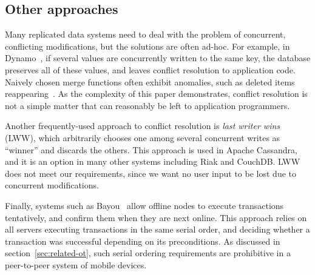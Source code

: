 \documentclass[10pt,journal,compsoc]{IEEEtran}
\begin{document}
\subsection{Other approaches}\label{sec:related-other}

Many replicated data systems need to deal with the problem of concurrent, conflicting modifications, but the solutions are often ad-hoc. For example, in Dynamo~\cite{DeCandia:2007ui}, if several values are concurrently written to the same key, the database preserves all of these values, and leaves conflict resolution to application code. Naively chosen merge functions often exhibit anomalies, such as deleted items reappearing~\cite{DeCandia:2007ui}. As the complexity of this paper demonstrates, conflict resolution is not a simple matter that can reasonably be left to application programmers.

Another frequently-used approach to conflict resolution is \emph{last writer wins} (LWW), which arbitrarily chooses one among several concurrent writes as ``winner'' and discards the others. This approach is used in Apache Cassandra, and it is an option in many other systems including Riak and CouchDB. LWW does not meet our requirements, since we want no user input to be lost due to concurrent modifications.

Finally, systems such as Bayou~\cite{Terry:1995dn} allow offline nodes to execute transactions tentatively, and confirm them when they are next online. This approach relies on all servers executing transactions in the same serial order, and deciding whether a transaction was successful depending on its preconditions. As discussed in section~\ref{sec:related-ot}, such serial ordering requirements are prohibitive in a peer-to-peer system of mobile devices.


{}
\end{document}

